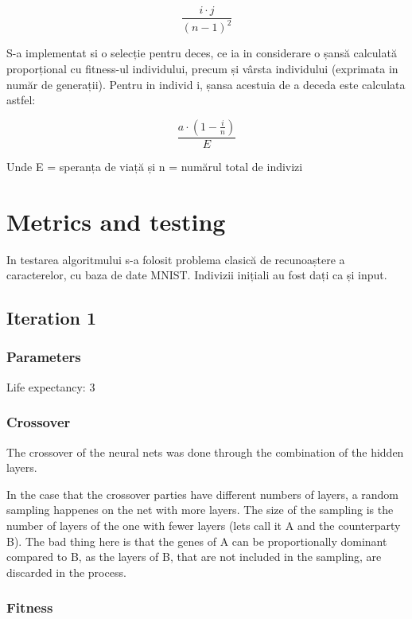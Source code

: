 \documentclass[11pt]{article}
\begin{document}
    \[\frac{i \cdot j}{{(n - 1)}^{2}}\]

    S-a implementat si o selecție pentru deces, ce ia in considerare o șansă
calculată proporțional cu fitness-ul individului, precum și vârsta
individului (exprimata in număr de generații). Pentru in individ i,
șansa acestuia de a deceda este calculata astfel:

    \[\frac{a \cdot (1 - \frac{i}{n})}{E}\]

Unde E = speranța de viață și n = numărul total de indivizi

    \hypertarget{metrics-and-testing}{%
\section{Metrics and testing}\label{metrics-and-testing}}

In testarea algoritmului s-a folosit problema clasică de recunoaștere a
caracterelor, cu baza de date MNIST. Indivizii inițiali au fost dați ca
și input.

    \hypertarget{iteration-1}{%
\subsection{Iteration 1}\label{iteration-1}}

\hypertarget{parameters}{%
\subsubsection{Parameters}\label{parameters}}

Life expectancy: 3

\hypertarget{crossover}{%
\subsubsection{Crossover}\label{crossover}}

The crossover of the neural nets was done through the combination of the
hidden layers.

In the case that the crossover parties have different numbers of layers,
a random sampling happenes on the net with more layers. The size of the
sampling is the number of layers of the one with fewer layers (lets call
it A and the counterparty B). The bad thing here is that the genes of A
can be proportionally dominant compared to B, as the layers of B, that
are not included in the sampling, are discarded in the process.

\hypertarget{fitness}{%
\subsubsection{Fitness}\label{fitness}}
\end{document}
